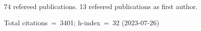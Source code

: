 74 refereed publications. 13 refeered publications as first author.

Total citations~=~3401; h-index~=~32 (2023-07-26)